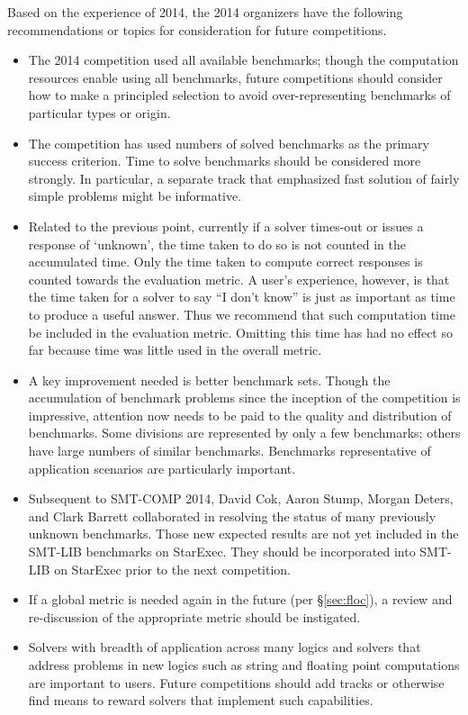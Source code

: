\documentclass[twoside,11pt]{article}
\begin{document}
Based on the experience of 2014, the 2014 organizers have the following recommendations or topics for consideration for future competitions.
\begin{itemize}
\item The 2014 competition used all available benchmarks; though the computation resources enable using all benchmarks, future competitions should consider how to make a principled selection to avoid over-representing benchmarks of particular types or origin.
\item The competition has used numbers of solved benchmarks as the primary success criterion. Time to solve benchmarks should be considered more strongly. In particular, a separate track that emphasized fast solution of fairly simple problems might be informative.
\item Related to the previous point, currently if a solver times-out or issues a response of `unknown', the time taken to do so is not counted in the accumulated time. Only the time taken to compute correct responses is counted towards the evaluation metric.
A user's experience, however, is that the time taken for a solver to say ``I don't know'' is just as important as time to produce a useful answer. Thus we recommend that such 
computation time be included in the evaluation metric. Omitting this time has had no effect so far because time was little used in the overall metric.
\item A key improvement needed is better benchmark sets. Though the accumulation of benchmark problems since the inception of the competition is impressive, attention now needs to be paid to the quality and distribution of benchmarks. Some divisions are represented by only a few benchmarks; others have large numbers of similar benchmarks.
Benchmarks representative of application scenarios are particularly important.
\item Subsequent to SMT-COMP 2014, David Cok, Aaron Stump, Morgan Deters, and Clark Barrett collaborated in resolving the status of many previously unknown benchmarks. Those new expected results are not yet included in the SMT-LIB benchmarks on StarExec. They should be incorporated into SMT-LIB on StarExec prior to the next competition.
\item If a global metric is needed again in the future (per \S\ref{sec:floc}), a review and re-discussion of the appropriate metric should be instigated.
\item Solvers with breadth of application across many logics and solvers that address problems in new logics such as string and floating point computations are important to users. Future competitions should add tracks or otherwise find means to reward solvers that implement such capabilities.

\end{itemize}
\end{document}
